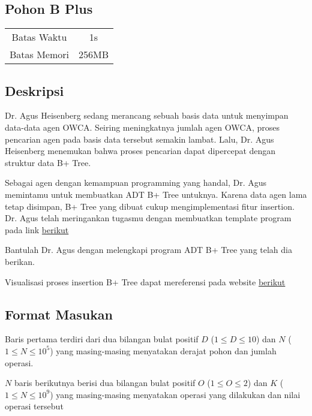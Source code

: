 \documentclass{article}
\begin{document}
\begin{center}

    
    \section*{Pohon B Plus} %

    \begin{tabular}{ | c c | }
        \hline
        Batas Waktu  & 1s \\    %
        Batas Memori & 256MB \\  %
        \hline
    \end{tabular}
\end{center}

\subsection*{Deskripsi}

Dr. Agus Heisenberg sedang merancang sebuah basis data untuk menyimpan data-data agen OWCA. Seiring meningkatnya jumlah agen OWCA, proses pencarian agen pada basis data tersebut semakin lambat. Lalu, Dr. Agus Heisenberg menemukan bahwa proses pencarian dapat dipercepat dengan struktur data B+ Tree. 

Sebagai agen dengan kemampuan programming yang handal, Dr. Agus memintamu untuk membuatkan ADT B+ Tree untuknya. Karena data agen lama tetap disimpan, B+ Tree yang dibuat cukup mengimplementasi fitur insertion. Dr. Agus telah meringankan tugasmu dengan membuatkan template program pada link \href{https://drive.google.com/drive/folders/19CcSmHoxypupEgl6w9DckooEcUfqM3qY?usp=sharing}{berikut}

Bantulah Dr. Agus dengan melengkapi program ADT B+ Tree yang telah dia berikan.

Visualisasi proses insertion B+ Tree dapat mereferensi pada website \href{https://www.cs.usfca.edu/~galles/visualization/BTree.html}{berikut}

\subsection*{Format Masukan}

Baris pertama terdiri dari dua bilangan bulat positif $D$ ($1 \leq D \leq 10$) dan $N$ ($1 \leq N \leq 10^{5}$) yang masing-masing menyatakan derajat pohon dan jumlah operasi.

$N$ baris berikutnya berisi dua bilangan bulat positif $O$ ($1 \leq O \leq 2$) dan $K$ ($1 \leq N \leq 10^{9}$) yang masing-masing menyatakan operasi yang dilakukan dan nilai operasi tersebut
\end{document}
